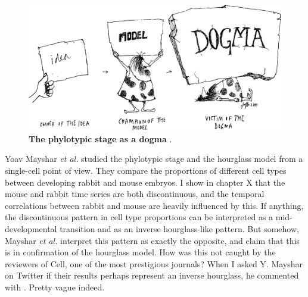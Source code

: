 \begin{figure}[H]
    \includegraphics[width=\linewidth]{ch.discussion/imgs/dogma.png}
    \caption{\textbf{The phylotypic stage as a dogma} \cite{Caveman2000}.}
    \label{fig:dogma}
\end{figure}

Yoav Mayshar \textit{et al.} studied the phylotypic stage and the hourglass model from a single-cell point of view\cite{Mayshar2023}. They compare the proportions of different cell types between developing rabbit and mouse embryos. I show in chapter X that the mouse and rabbit time series are both discontinuous, and the temporal correlations between rabbit and mouse are heavily influenced by this. If anything, the discontinuous pattern in cell type proportions can be interpreted as a mid-developmental transition and as an inverse hourglass-like pattern. But somehow, Mayshar \textit{et al.} interpret this pattern as exactly the opposite, and claim that this is in confirmation of the hourglass model. How was this not caught by the reviewers of Cell, one of the most prestigious journals? When I asked Y. Mayshar on Twitter if their results perhaps represent an inverse hourglass, he commented with . Pretty vague indeed.

